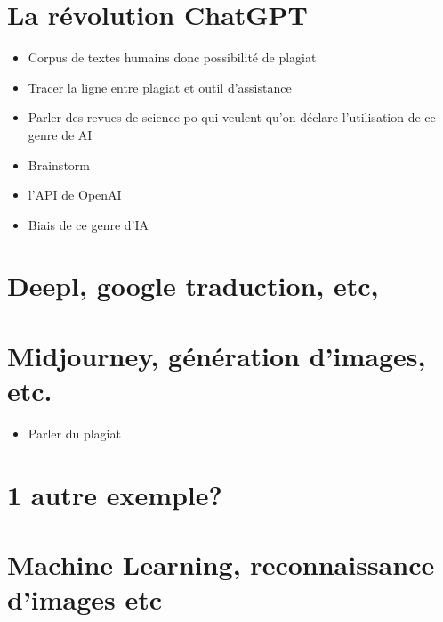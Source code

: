\documentclass[
  letterpaper,
]{scrbook}
\providecommand{\tightlist}{%
  \setlength{\itemsep}{0pt}\setlength{\parskip}{0pt}}\usepackage{longtable,booktabs,array}
\begin{document}

\hypertarget{la-ruxe9volution-chatgpt}{%
\chapter{La révolution ChatGPT}\label{la-ruxe9volution-chatgpt}}

\begin{itemize}
\tightlist
\item
  Corpus de textes humains donc possibilité de plagiat
\item
  Tracer la ligne entre plagiat et outil d'assistance
\item
  Parler des revues de science po qui veulent qu'on déclare
  l'utilisation de ce genre de AI
\item
  Brainstorm
\item
  l'API de OpenAI
\item
  Biais de ce genre d'IA
\end{itemize}


\hypertarget{deepl-google-traduction-etc}{%
\chapter{Deepl, google traduction,
etc,}\label{deepl-google-traduction-etc}}


\hypertarget{midjourney-guxe9nuxe9ration-dimages-etc.}{%
\chapter{Midjourney, génération d'images,
etc.}\label{midjourney-guxe9nuxe9ration-dimages-etc.}}

\begin{itemize}
\tightlist
\item
  Parler du plagiat
\end{itemize}


\hypertarget{autre-exemple}{%
\chapter{1 autre exemple?}\label{autre-exemple}}


\hypertarget{machine-learning-reconnaissance-dimages-etc}{%
\chapter{Machine Learning, reconnaissance d'images
etc}\label{machine-learning-reconnaissance-dimages-etc}}
\end{document}
